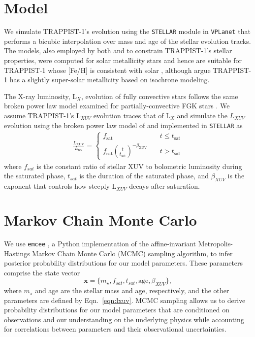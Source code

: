 \documentclass[twocolumn]{aastex62}
\newcommand{\vplanet}[0]{\texttt{VPLanet}\xspace}
\newcommand{\stellar}[0]{\texttt{STELLAR}\xspace}
\begin{document}
\section{Model} \label{sec:model}

We simulate TRAPPIST-1's evolution using the \stellar module in \vplanet \citep{Barnes2016,vplanet2018} that performs a bicubic interpolation over mass and age of the \citet{Baraffe2015} stellar evolution tracks. The \citet{Baraffe2015} models, also employed by both \citet{Burgasser2017} and \citet{vanGrootel2018} to constrain TRAPPIST-1's stellar properties, were computed for solar metallicity stars and hence are suitable for TRAPPIST-1 whose [Fe/H] is consistent with solar \citep{Gillon2016}, although \citet{Burgasser2017} argue TRAPPIST-1 has a slightly super-solar metallicity based on isochrone modeling.

The X-ray luminosity, L$_{X}$, evolution of fully convective stars follows the same broken power law model examined for partially-convective FGK stars \citep{Wright2016,Wright2018}. We assume TRAPPIST-1's L$_{XUV}$ evolution traces that of L$_{X}$ and simulate the $L_{XUV}$ evolution using the broken power law model of \citet{Pizzolato2003} and \citet{Ribas2005} implemented in \stellar as
\begin{align}
\label{eqn:lxuv}
\frac{L_\mathrm{XUV}}{L_\mathrm{bol}} = \left\{
				\begin{array}{lcr}
					f_\mathrm{sat} &\ & t \leq t_\mathrm{sat} \\
					f_\mathrm{sat}\left(\frac{t}{t_\mathrm{sat}}\right)^{-\beta_\mathrm{XUV}} &\ & t > t_\mathrm{sat}
				\end{array}
				\right.
\end{align}
where $f_{sat}$ is the constant ratio of stellar XUV to bolometric luminosity during the saturated phase, $t_{sat}$ is the duration of the saturated phase, and $\beta_{XUV}$ is the exponent that controls how steeply L$_{XUV}$ decays after saturation.


\section{Markov Chain Monte Carlo} \label{sec:mcmc}

We use \texttt{emcee} \citep{ForemanMackey2013}, a Python implementation of the \citet{Goodman2010} affine-invariant Metropolis-Hastings Markov Chain Monte Carlo (MCMC) sampling algorithm, to infer posterior probability distributions for our model parameters. These parameters comprise the state vector
\begin{equation}
    \textbf{x} = \{m_{\star}, f_{sat}, t_{sat}, \mathrm{age}, \beta_{XUV}\},
\end{equation}
where $m_{\star}$ and age are the stellar mass and age, respectively, and the other parameters are defined by Eqn.~\ref{eqn:lxuv}.  MCMC sampling allows us to derive probability distributions for our model parameters that are conditioned on observations and our understanding on the underlying physics while accounting for correlations between parameters and their observational uncertainties.  
\end{document}
